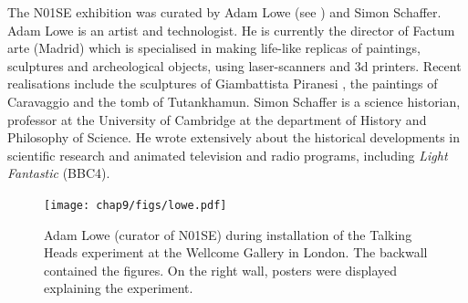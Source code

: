 The N01SE exhibition was curated by Adam Lowe (see ) and Simon Schaffer. 
Adam Lowe is an artist and technologist. He is currently the director of Factum arte (Madrid) which is specialised 
in making life-like replicas of paintings, sculptures and archeological objects, using laser-scanners and 3d printers. 
Recent realisations include the sculptures of Giambattista Piranesi \citep{Lowe:2010}, the 
paintings of Caravaggio and the tomb of Tutankhamun. 
Simon Schaffer is a science historian, professor at the University of Cambridge at the department of History and Philosophy 
of Science. He wrote extensively about the historical developments in scientific research \citep{Schaffer:2011}
and animated television and radio programs, including {\itshape Light Fantastic} (BBC4). 
\begin{figure}[htbp]
  \centerline{\texttt{[image: chap9/figs/lowe.pdf]}}
\caption{\label{fig:lowe}Adam Lowe (curator of N01SE) during installation of the Talking Heads experiment at the Wellcome Gallery in London. 
The backwall contained the figures. On the right wall, posters were displayed explaining the experiment.}
\end{figure}

